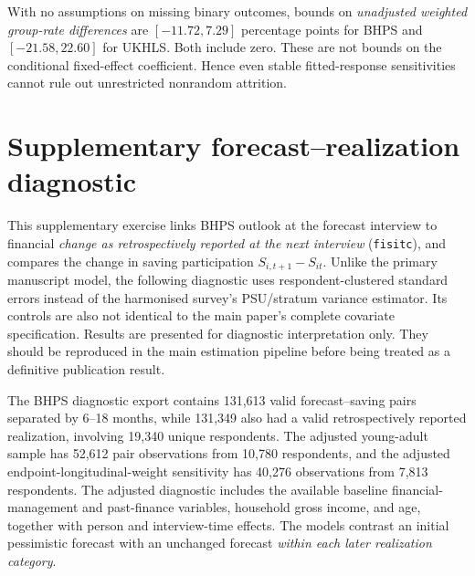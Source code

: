 With no assumptions on missing binary outcomes, bounds on \emph{unadjusted weighted group-rate differences} are $[-11.72,7.29]$ percentage points for BHPS and $[-21.58,22.60]$ for UKHLS. Both include zero. These are not bounds on the conditional fixed-effect coefficient. Hence even stable fitted-response sensitivities cannot rule out unrestricted nonrandom attrition.

\section{Supplementary forecast--realization diagnostic}\label{sec:realizations}

This supplementary exercise links BHPS outlook at the forecast interview to financial \emph{change as retrospectively reported at the next interview} (\texttt{fisitc}), and compares the change in saving participation $S_{i,t+1}-S_{it}$. Unlike the primary manuscript model, the following diagnostic uses respondent-clustered standard errors instead of the harmonised survey's PSU/stratum variance estimator. Its controls are also not identical to the main paper's complete covariate specification. Results are presented for diagnostic interpretation only. They should be reproduced in the main estimation pipeline before being treated as a definitive publication result.

The BHPS diagnostic export contains 131,613 valid forecast--saving pairs separated by 6--18 months, while 131,349 also had a valid retrospectively reported realization, involving 19,340 unique respondents. The adjusted young-adult sample has 52,612 pair observations from 10,780 respondents, and the adjusted endpoint-longitudinal-weight sensitivity has 40,276 observations from 7,813 respondents. The adjusted diagnostic includes the available baseline financial-management and past-finance variables, household gross income, and age, together with person and interview-time effects. The models contrast an initial pessimistic forecast with an unchanged forecast \emph{within each later realization category}.

